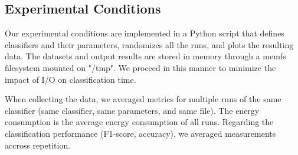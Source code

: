 \subsection{Experimental Conditions}
Our experimental conditions are implemented in a Python script that defines
classifiers and their parameters, randomizes all the runs, and plots the
resulting data. The datasets and output results are stored in memory
through a memfs filesystem mounted on "/tmp". We proceed in this manner to
minimize the impact of I/O on classification time.

When collecting the data, we averaged metrics for multiple runs of the same
classifier (same classifier, same parameters, and same file). The energy
consumption is the average energy consumption of all runs. Regarding the
classification performance (F1-score, accuracy), we averaged measurements
accross repetition.

